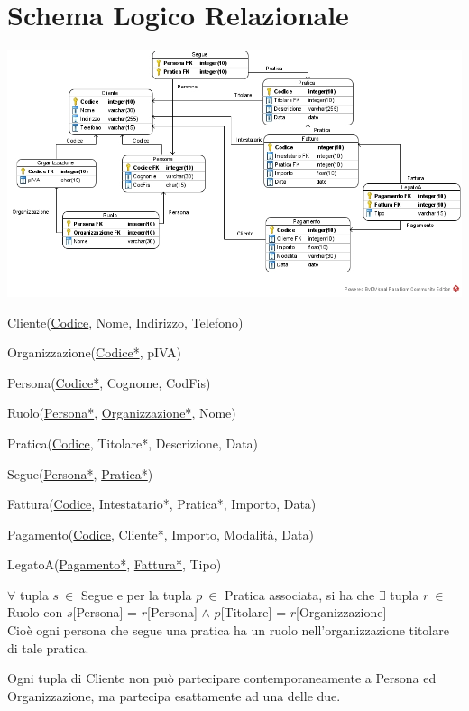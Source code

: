 \documentclass[10pt]{article}
\begin{document}
\section{Schema Logico Relazionale}
\begin{center}
	\includegraphics[scale=0.5]{LogicoRelazionale.jpg}
\end{center}
\begin{list}{}{\textbf{Notazione testuale}}
	\item Cliente(\underline{Codice}, Nome, Indirizzo, Telefono)
	\item Organizzazione(\underline{Codice*}, pIVA)
	\item Persona(\underline{Codice*}, Cognome, CodFis)
	\item Ruolo(\underline{Persona*}, \underline{Organizzazione*}, Nome)
	\item Pratica(\underline{Codice}, Titolare*, Descrizione, Data)
	\item Segue(\underline{Persona*}, \underline{Pratica*})
	\item Fattura(\underline{Codice}, Intestatario*, Pratica*, Importo, Data)
	\item Pagamento(\underline{Codice}, Cliente*, Importo, Modalità, Data)
	\item LegatoA(\underline{Pagamento*}, \underline{Fattura*}, Tipo)
\end{list}
\begin{list}{}{\textbf{Vincoli non catturati graficamente}}
	\item $\forall$ tupla $s\:\in$ Segue e per la tupla $p\:\in$ Pratica associata, si ha che $\exists$ tupla $r\:\in$ Ruolo con $s$[Persona] = $r$[Persona] $\wedge$ $p$[Titolare] = $r$[Organizzazione]\\
	Cioè ogni persona che segue una pratica ha un ruolo nell'organizzazione titolare di tale pratica.
	\item Ogni tupla di Cliente non può partecipare contemporaneamente a Persona ed Organizzazione, ma partecipa esattamente ad una delle due.
\end{list}
\pagebreak
\end{document}
